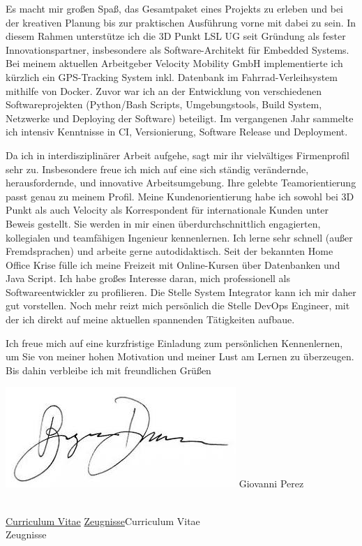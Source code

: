 \documentclass[a4paper,10pt]{article}
\begin{document}
Es macht mir großen Spaß, das Gesamtpaket eines Projekts zu erleben und bei der kreativen Planung bis zur praktischen Ausführung vorne mit dabei zu sein. In diesem Rahmen unterstütze ich die 3D Punkt LSL UG seit Gründung als fester Innovationspartner, insbesondere als Software-Architekt für Embedded Systems. Bei meinem aktuellen Arbeitgeber Velocity Mobility GmbH implementierte ich kürzlich ein GPS-Tracking System inkl. Datenbank im Fahrrad-Verleihsystem mithilfe von Docker. Zuvor war ich an der Entwicklung von verschiedenen Softwareprojekten (Python/Bash Scripts, Umgebungstools, Build System, Netzwerke und Deploying der Software) beteiligt. Im vergangenen Jahr sammelte ich intensiv Kenntnisse in CI, Versionierung, Software Release und Deployment.  \vfill

Da ich in interdisziplinärer Arbeit aufgehe, sagt mir ihr vielvältiges Firmenprofil sehr zu. Insbesondere freue ich mich auf eine sich ständig verändernde, herausfordernde, und innovative Arbeitsumgebung. Ihre gelebte Teamorientierung passt genau zu meinem Profil. Meine Kundenorientierung habe ich sowohl bei 3D Punkt als auch Velocity als Korrespondent für internationale Kunden unter Beweis gestellt.\vfill
Sie werden in mir einen überdurchschnittlich engagierten, kollegialen und teamfähigen Ingenieur kennenlernen. Ich lerne sehr schnell (außer Fremdsprachen) und arbeite gerne autodidaktisch. Seit der bekannten Home Office Krise fülle ich meine Freizeit mit Online-Kursen über Datenbanken und Java Script. Ich habe großes Interesse daran, mich professionell als Softwareentwickler zu profilieren. Die Stelle System Integrator kann ich mir daher gut vorstellen. Noch mehr reizt mich persönlich die Stelle DevOps Engineer, mit der ich direkt auf meine aktuellen spannenden Tätigkeiten aufbaue. \vfill

Ich freue mich auf eine kurzfristige Einladung zum persönlichen Kennenlernen, um Sie von meiner
hohen Motivation und meiner Lust am Lernen zu überzeugen. Bis dahin verbleibe ich\vfill
mit freundlichen Grüßen



\begin{minipage}[c][3cm][b]{4cm}
	\includegraphics[width=0.7\linewidth]{pics/images.jpeg}
	\centering Giovanni Perez
\end{minipage}
\hfill
\begin{minipage}[c][3cm][b]{4cm}
\\ \hspace{0.5cm}
\href{page.3}{Curriculum Vitae}
\href{https://www.dropbox.com/s/eupscb6bi17vcpj/Perez_Zeugnisse.pdf?dl=0}{Zeugnisse}Curriculum Vitae\\ Zeugnisse
\end{minipage}



\pagebreak
\end{document}
